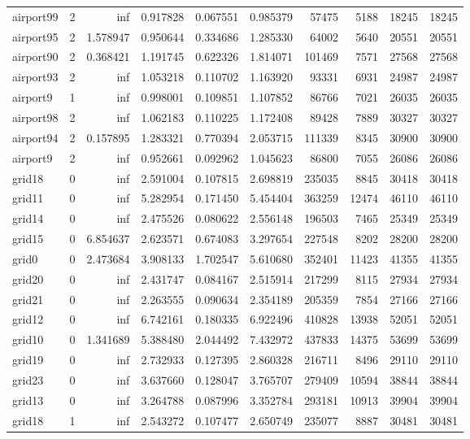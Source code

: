 \begin{longtable}{|l|r|r|r|r|r|r|r|r|r|}
airport99 & 2 & inf & 0.917828 & 0.067551 & 0.985379 & 57475 & 5188 & 18245 & 18245 \\
airport95 & 2 & 1.578947 & 0.950644 & 0.334686 & 1.285330 & 64002 & 5640 & 20551 & 20551 \\
airport90 & 2 & 0.368421 & 1.191745 & 0.622326 & 1.814071 & 101469 & 7571 & 27568 & 27568 \\
airport93 & 2 & inf & 1.053218 & 0.110702 & 1.163920 & 93331 & 6931 & 24987 & 24987 \\
airport9 & 1 & inf & 0.998001 & 0.109851 & 1.107852 & 86766 & 7021 & 26035 & 26035 \\
airport98 & 2 & inf & 1.062183 & 0.110225 & 1.172408 & 89428 & 7889 & 30327 & 30327 \\
airport94 & 2 & 0.157895 & 1.283321 & 0.770394 & 2.053715 & 111339 & 8345 & 30900 & 30900 \\
airport9 & 2 & inf & 0.952661 & 0.092962 & 1.045623 & 86800 & 7055 & 26086 & 26086 \\
grid18 & 0 & inf & 2.591004 & 0.107815 & 2.698819 & 235035 & 8845 & 30418 & 30418 \\
grid11 & 0 & inf & 5.282954 & 0.171450 & 5.454404 & 363259 & 12474 & 46110 & 46110 \\
grid14 & 0 & inf & 2.475526 & 0.080622 & 2.556148 & 196503 & 7465 & 25349 & 25349 \\
grid15 & 0 & 6.854637 & 2.623571 & 0.674083 & 3.297654 & 227548 & 8202 & 28200 & 28200 \\
grid0 & 0 & 2.473684 & 3.908133 & 1.702547 & 5.610680 & 352401 & 11423 & 41355 & 41355 \\
grid20 & 0 & inf & 2.431747 & 0.084167 & 2.515914 & 217299 & 8115 & 27934 & 27934 \\
grid21 & 0 & inf & 2.263555 & 0.090634 & 2.354189 & 205359 & 7854 & 27166 & 27166 \\
grid12 & 0 & inf & 6.742161 & 0.180335 & 6.922496 & 410828 & 13938 & 52051 & 52051 \\
grid10 & 0 & 1.341689 & 5.388480 & 2.044492 & 7.432972 & 437833 & 14375 & 53699 & 53699 \\
grid19 & 0 & inf & 2.732933 & 0.127395 & 2.860328 & 216711 & 8496 & 29110 & 29110 \\
grid23 & 0 & inf & 3.637660 & 0.128047 & 3.765707 & 279409 & 10594 & 38844 & 38844 \\
grid13 & 0 & inf & 3.264788 & 0.087996 & 3.352784 & 293181 & 10913 & 39904 & 39904 \\
grid18 & 1 & inf & 2.543272 & 0.107477 & 2.650749 & 235077 & 8887 & 30481 & 30481 \\

\end{longtable}
